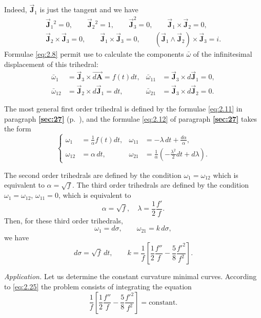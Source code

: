 \documentclass[leqno,11pt]{book}
\numberwithin{equation}{chapter}
\theoremstyle{shape1}
\theoremstyle{shapesmall}
\newcommand{\fsref}[1]{{\rm\textsection\textbf{\ref{sec:#1}}}}
\newcommand{\rvec}[1]{\vec{\mathbf{#1}}}
\newcommand{\jvec}{\rvec{J}}
\newcommand{\somespace}{\vspace{9pt}}
\begin{document}
Indeed, $\jvec_{1}$ is just the tangent and we have
\begin{gather*}
  \jvec_{1}{}^{2}=0,\qquad\jvec_{2}{}^{2}=1,\qquad\jvec_{3}^{2}=0,\qquad \jvec_{1}\times\jvec_{2}=0,\\
  \jvec_{2}\times\jvec_{3}=0,\qquad\jvec_{1}\times\jvec_{3}=0,\qquad(\jvec_{1}\wedge\jvec_{2})\times\jvec_{3}=i.
\end{gather*}
Formulae \eqref{eq:2.8} permit use to calculate the components $\bar\omega$ of the infinitesimal displacement of this trihedral:
\begin{align*}
  \bar\omega_{1}&=\jvec_{3}\times\overrightarrow{d\mathbf{A}}=f(t)dt,&\bar\omega_{11}&=\jvec_{3}\times d\jvec_{1}=0,\\
  \bar\omega_{12}&=\jvec_{2}\times d\jvec_{1}=dt,&\bar\omega_{21}&=\jvec_{3}\times d\jvec_{2}=0.
\end{align*}

The most general first order trihedral is defined by the formulae \eqref{eq:2.11} in paragraph \fsref{27} (p.~\pageref{eq:2.11}), and the formulae \eqref{eq:2.12} of paragraph \fsref{27} takes the form
\begin{equation}
  \label{eq:2.24}
  \left\{
    \begin{aligned}
      \omega_{1}&=\frac{1}{\alpha}f(t)dt,&\omega_{11}&=-\lambda\,dt+\frac{d\alpha}{\alpha},\\
      \omega_{12}&=\alpha\,dt,&\omega_{21}&=\frac{1}{\alpha}\left(-\frac{\lambda^{2}}{2}dt+d\lambda\right).
    \end{aligned}
  \right.
\end{equation}

The second order trihedrals are defined by the condition $\omega_{1}=\omega_{12}$ which is equivalent to $\alpha=\sqrt{f}$. The third order trihedrals are defined by the condition $\omega_{1}=\omega_{12}$, $\omega_{11}=0$, which is equivalent to
\[
\alpha=\sqrt{f},\quad\lambda=\frac{1}{2}\frac{f'}{f}.
\]
Then, for these third order trihedrals,
\[
\omega_{1}=d\sigma,\qquad\omega_{21}=k\,d\sigma,
\]
we have
\begin{equation}
  \label{eq:2.25}
  d\sigma=\sqrt{f}\,dt,\qquad k=\frac{1}{f}\left[\frac{1}{2}\frac{f''}{f}-\frac{5}{8}\frac{f'^{2}}{f^{2}}\right].
\end{equation}

\somespace

\emph{Application.} Let us determine the constant curvature minimal curves. According to \eqref{eq:2.25} the problem consists of integrating the equation
\[
\frac{1}{f}\left[\frac{1}{2}\frac{f''}{f}-\frac{5}{8}\frac{f'^{2}}{f^{2}}\right]=\text{constant.}
\]
\end{document}
